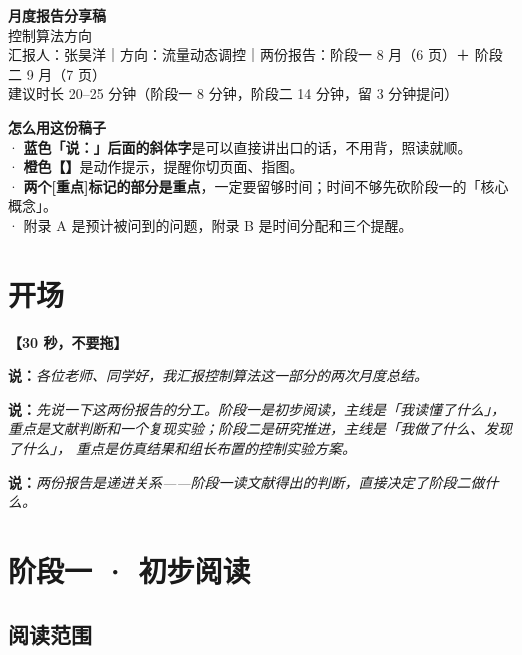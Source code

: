 \documentclass[11pt,a4paper]{ctexart}
\newcommand{\shuo}[1]{\par{\color{cBlue}\bfseries 说：}{\itshape #1}\par}
\newcommand{\dongzuo}[1]{\par{\color{cWarnLine}\bfseries 【#1】}\par}
\begin{document}
\begin{center}
{\LARGE\bfseries\color{cBlue} 月度报告分享稿}\\[6pt]
{\large 控制算法方向}\\[10pt]
{\small\color{cGrey}
汇报人：张昊洋\hspace{1em}｜\hspace{1em}方向：流量动态调控\hspace{1em}｜\hspace{1em}两份报告：阶段一 8 月（6 页）＋ 阶段二 9 月（7 页）}\\[4pt]
{\small\color{cGrey}建议时长 20--25 分钟（阶段一 8 分钟，阶段二 14 分钟，留 3 分钟提问）}
\end{center}

\vspace{4pt}

\begin{tishi}
\textbf{怎么用这份稿子}\\[3pt]
· \textbf{蓝色「说：」后面的斜体字}是可以直接讲出口的话，不用背，照读就顺。\\
· \textbf{橙色【】}是动作提示，提醒你切页面、指图。\\
· \textbf{两个[重点]标记的部分是重点}，一定要留够时间；时间不够先砍阶段一的「核心概念」。\\
· 附录 A 是预计被问到的问题，附录 B 是时间分配和三个提醒。
\end{tishi}

\section{开场}

\dongzuo{30 秒，不要拖}

\shuo{各位老师、同学好，我汇报控制算法这一部分的两次月度总结。}

\shuo{先说一下这两份报告的分工。阶段一是初步阅读，主线是「我读懂了什么」，
重点是文献判断和一个复现实验；阶段二是研究推进，主线是「我做了什么、发现了什么」，
重点是仿真结果和组长布置的控制实验方案。}

\shuo{两份报告是递进关系——阶段一读文献得出的判断，直接决定了阶段二做什么。}

\section{阶段一 · 初步阅读}

\subsection{阅读范围}
\end{document}
